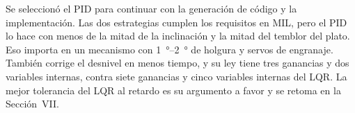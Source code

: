 Se seleccionó el PID para continuar con la generación de código y la implementación. Las dos
estrategias cumplen los requisitos en MIL, pero el PID lo hace con menos de la mitad de la
inclinación y la mitad del temblor del plato. Eso importa en un mecanismo con
\SIrange{1}{2}{\degree} de holgura y servos de engranaje. También corrige el desnivel en menos
tiempo, y su ley tiene tres ganancias y dos variables internas, contra siete ganancias y cinco
variables internas del LQR. La mejor tolerancia del LQR al retardo es su argumento a favor y se retoma en la
Sección~VII.

